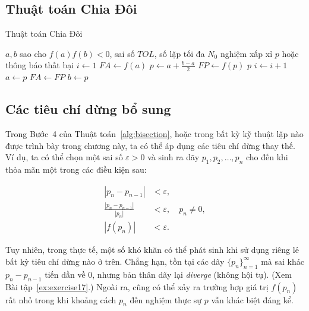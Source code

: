 \subsection{Thuật toán Chia Đôi}
\label{subsec:bisection_algorithm}

\begin{algorithm}
\caption{Thuật toán Chia Đôi}
\label{alg:bisection}
\begin{algorithmic}[1]
\REQUIRE $a,b$ sao cho $f(a)f(b) < 0$, sai số $TOL$, số lặp tối đa $N_0$
\ENSURE nghiệm xấp xỉ $p$ hoặc thông báo thất bại
\STATE $i \gets 1$
\STATE $FA \gets f(a)$
    \STATE $p \gets a + \frac{b-a}{2}$
    \STATE $FP \gets f(p)$
        \RETURN $p$
    \ENDIF
    \STATE $i \gets i+1$
        \STATE $a \gets p$
        \STATE $FA \gets FP$
    \ELSE
        \STATE $b \gets p$
    \ENDIF
\ENDWHILE
{}
\end{algorithmic}
\end{algorithm}

\subsection*{Các tiêu chí dừng bổ sung}
\label{subsec:additional_stopping}

Trong Bước~4 của Thuật toán~\ref{alg:bisection}, hoặc trong bất kỳ kỹ thuật lặp nào
được trình bày trong chương này, ta có thể áp dụng các tiêu chí dừng thay thế.
Ví dụ, ta có thể chọn một sai số $\varepsilon > 0$ và sinh ra dãy
$p_1, p_2, \dots, p_n$ cho đến khi thỏa mãn một trong các điều kiện sau:

\begin{align}
|p_n - p_{n-1}| &< \varepsilon, \label{eq:stop_a}\\[6pt]
\frac{|p_n - p_{n-1}|}{|p_n|} &< \varepsilon, \quad p_n \neq 0, \label{eq:stop_b}\\[6pt]
|f(p_n)| &< \varepsilon. \label{eq:stop_c}
\end{align}

Tuy nhiên, trong thực tế, một số khó khăn có thể phát sinh khi sử dụng riêng lẻ
bất kỳ tiêu chí dừng nào ở trên. Chẳng hạn, tồn tại các dãy $\{p_n\}_{n=1}^{\infty}$
mà sai khác $p_n - p_{n-1}$ tiến dần về 0, nhưng bản thân dãy lại \emph{diverge}
(không hội tụ). (Xem Bài tập~\ref{ex:exercise17}.) Ngoài ra, cũng có thể xảy ra trường hợp
giá trị $f(p_n)$ rất nhỏ trong khi khoảng cách $p_n$ đến nghiệm thực sự $p$ vẫn khác biệt đáng kể.

